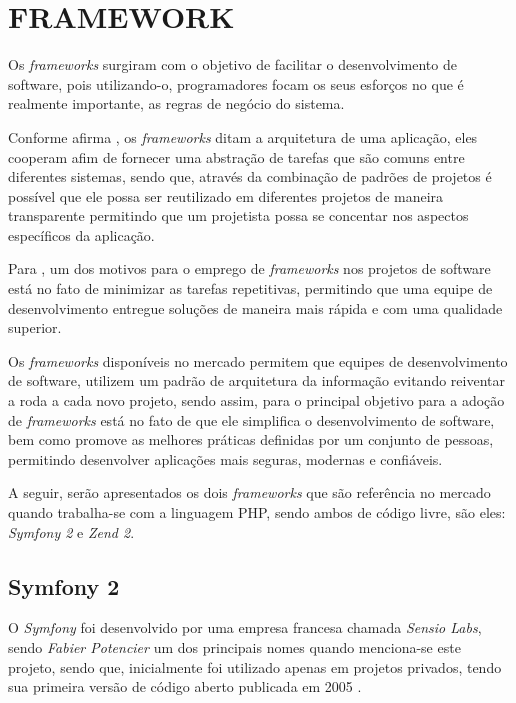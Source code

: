 \section{FRAMEWORK}

Os \textit{frameworks} surgiram com o objetivo de facilitar o desenvolvimento de
software, pois utilizando-o, programadores focam os seus esforços no que é
realmente importante, as regras de negócio do sistema.

Conforme afirma , os
\textit{frameworks} ditam a arquitetura de uma aplicação, eles cooperam afim de fornecer 
uma abstração de tarefas que são comuns entre diferentes sistemas, sendo que, 
através da combinação de padrões de projetos é possível que ele possa ser 
reutilizado em diferentes projetos de maneira transparente permitindo que um 
projetista possa se concentar nos aspectos específicos da aplicação.

Para , um dos motivos para o 
emprego de \textit{frameworks} nos projetos de software está no fato de minimizar as 
tarefas repetitivas, permitindo que uma equipe de desenvolvimento entregue 
soluções de maneira mais rápida e com uma qualidade superior.

Os \textit{frameworks} disponíveis no mercado permitem que equipes de
desenvolvimento de software, utilizem um padrão de arquitetura da informação 
evitando reiventar a roda a cada novo projeto, sendo assim, para 
 o principal objetivo para
a adoção de \textit{frameworks} está no fato de que ele simplifica o 
desenvolvimento de software, bem como promove as melhores práticas definidas por
um conjunto de pessoas, permitindo desenvolver aplicações mais seguras, modernas e
confiáveis.

A seguir, serão apresentados os dois \textit{frameworks} que são referência no
mercado quando trabalha-se com a linguagem \acs{PHP}, sendo ambos de código
livre, são eles: \textit{Symfony 2} e \textit{Zend 2}.

\subsection{Symfony 2}

O \textit{Symfony} foi desenvolvido por uma empresa francesa chamada
\textit{Sensio Labs}, sendo \textit{Fabier Potencier} um dos principais nomes
quando menciona-se este projeto, sendo que, inicialmente foi utilizado apenas em
projetos privados, tendo sua primeira versão de código aberto publicada em 2005 \cite{buildingPHPApplicationsWithSymfonyCakePHPAndZendFramework}.

